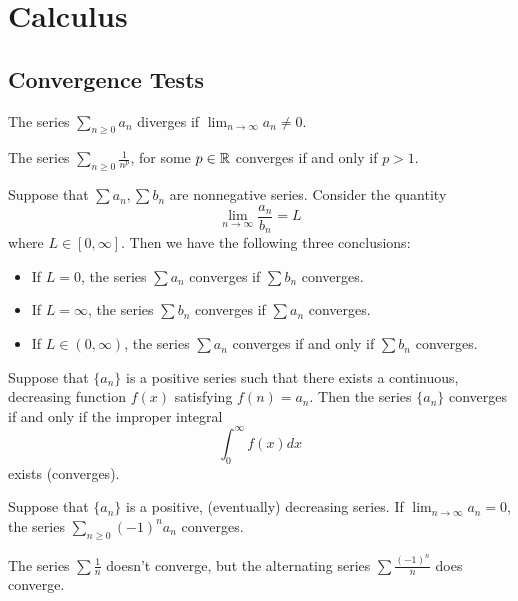 \section{Calculus}

\subsection{Convergence Tests}

\begin{theorem}
The series $\sum_{n \geq 0} a_n$ diverges if $\lim_{n\rightarrow\infty} a_n \neq 0$.
\end{theorem}

\begin{theorem}
The series $\sum_{n \geq 0} \frac{1}{n^p}$, for some $p\in\mathbb{R}$ converges if and only if
$p > 1$.
\end{theorem}

\begin{theorem}
Suppose that $\sum a_n, \sum b_n$ are nonnegative series. Consider the quantity
\[
\lim_{n\to\infty}\frac{a_n}{b_n}=L
\]
where $L\in[0,\infty]$. Then we have the following three conclusions:
\begin{itemize}
    \item If $L=0$, the series $\sum a_n$ converges if $\sum b_n$ converges.
    \item If $L=\infty$, the series $\sum b_n$ converges if $\sum a_n$ converges.
    \item If $L\in(0,\infty)$, the series $\sum a_n$ converges if and only if $\sum b_n$ converges.
\end{itemize}
\end{theorem}

\begin{theorem}
Suppose that $\{a_n\}$ is a positive series such that there exists a continuous,
decreasing function $f(x)$ satisfying $f(n)=a_n$. Then the series $\{a_n\}$ converges 
if and only if the improper integral
\[
\int_0^\infty f(x) dx
\]
exists (converges).
\end{theorem}

\begin{theorem}
Suppose that $\{a_n\}$ is a positive, (eventually) decreasing series. 
If $\lim_{n\to\infty}a_n=0$, the series $\sum_{n \geq 0}(-1)^n a_n$ converges.
\end{theorem}

\begin{example}
The series $\sum \frac{1}{n}$ doesn't converge, but the alternating 
series $\sum \frac{(-1)^n}{n}$ does converge.
\end{example}

